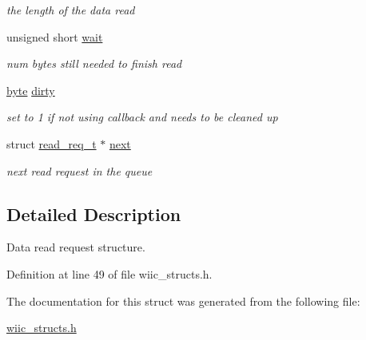 \begin{DoxyCompactItemize}
\begin{DoxyCompactList}\small\item\em the length of the data read \end{DoxyCompactList}\item 
\hypertarget{structread__req__t_aa0e807ee1e193efc139b48c2acd8bdf7}{unsigned short \hyperlink{structread__req__t_aa0e807ee1e193efc139b48c2acd8bdf7}{wait}}\label{structread__req__t_aa0e807ee1e193efc139b48c2acd8bdf7}

\begin{DoxyCompactList}\small\item\em num bytes still needed to finish read \end{DoxyCompactList}\item 
\hypertarget{structread__req__t_a8ac72c3b91e371aaeadb4d01ed0fb303}{\hyperlink{wiic__macros_8h_a0c8186d9b9b7880309c27230bbb5e69d}{byte} \hyperlink{structread__req__t_a8ac72c3b91e371aaeadb4d01ed0fb303}{dirty}}\label{structread__req__t_a8ac72c3b91e371aaeadb4d01ed0fb303}

\begin{DoxyCompactList}\small\item\em set to 1 if not using callback and needs to be cleaned up \end{DoxyCompactList}\item 
\hypertarget{structread__req__t_a42e28e162a2c16885a00cf6e01177a9e}{struct \hyperlink{structread__req__t}{read\-\_\-req\-\_\-t} $\ast$ \hyperlink{structread__req__t_a42e28e162a2c16885a00cf6e01177a9e}{next}}\label{structread__req__t_a42e28e162a2c16885a00cf6e01177a9e}

\begin{DoxyCompactList}\small\item\em next read request in the queue \end{DoxyCompactList}\end{DoxyCompactItemize}


\subsection{\-Detailed \-Description}
\-Data read request structure. 

\-Definition at line 49 of file wiic\-\_\-structs.\-h.



\-The documentation for this struct was generated from the following file\-:\begin{DoxyCompactItemize}
\item 
\hyperlink{wiic__structs_8h}{wiic\-\_\-structs.\-h}\end{DoxyCompactItemize}
